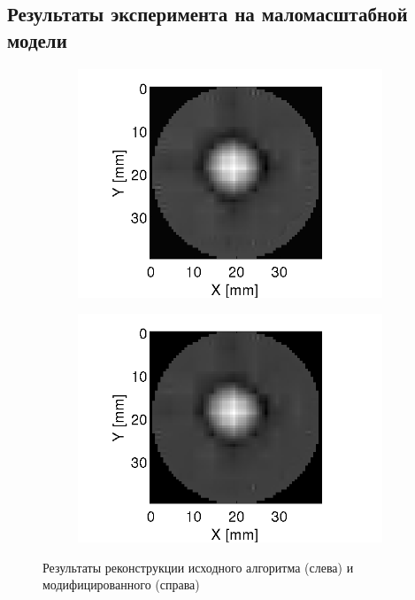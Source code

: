 \documentclass[14pt]{matmex-diploma}
\begin{document}
\subsection{Результаты эксперимента на маломасштабной модели}
\begin{figure}[h]
\centering
\begin{subfigure}{.45\textwidth}
    \centering
    \includegraphics[width=1\linewidth]{pics/slice_base_grad.png}
\end{subfigure}
\begin{subfigure}{.45\textwidth}
    \centering
    \includegraphics[width=1\linewidth]{pics/slice_cs_grad.png}
\end{subfigure}
    \caption{Результаты реконструкции исходного алгоритма (слева) и модифицированного (справа)}
    \label{fig:reconstruction_exp1}
\end{figure}
\end{document}
